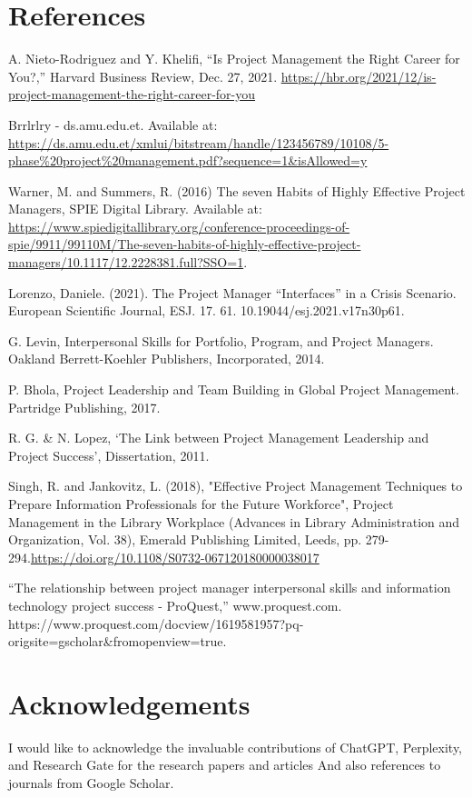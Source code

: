 \documentclass{article}
\begin{document}
\section*{References}
\vspace*{-35pt}
\renewcommand{\refname}{}
\begin{thebibliography}{99}
A. Nieto-Rodriguez and Y. Khelifi, “Is Project Management the Right Career for You?,” Harvard Business Review, Dec. 27, 2021. \url{https://hbr.org/2021/12/is-project-management-the-right-career-for-you}

Brrlrlry - ds.amu.edu.et. Available at: 
\url{https://ds.amu.edu.et/xmlui/bitstream/handle/123456789/10108/5-phase%20project%20management.pdf?sequence=1&isAllowed=y}

Warner, M. and Summers, R. (2016) The seven Habits of Highly Effective Project Managers, SPIE Digital Library. Available at: \url{https://www.spiedigitallibrary.org/conference-proceedings-of-spie/9911/99110M/The-seven-habits-of-highly-effective-project-managers/10.1117/12.2228381.full?SSO=1}. 

Lorenzo, Daniele. (2021). The Project Manager “Interfaces” in a Crisis Scenario. European Scientific Journal, ESJ. 17. 61. 10.19044/esj.2021.v17n30p61. 


G. Levin, Interpersonal Skills for Portfolio, Program, and Project Managers. Oakland Berrett-Koehler Publishers, Incorporated, 2014.


P. Bhola, Project Leadership and Team Building in Global Project Management. Partridge Publishing, 2017.


R. G. \& N. Lopez, ‘The Link between Project Management Leadership and Project Success’, Dissertation, 2011.


Singh, R. and Jankovitz, L. (2018), "Effective Project Management Techniques to Prepare Information Professionals for the Future Workforce", Project Management in the Library Workplace (Advances in Library Administration and Organization, Vol. 38), Emerald Publishing Limited, Leeds, pp. 279-294.\url{https://doi.org/10.1108/S0732-067120180000038017}


“The relationship between project manager interpersonal skills and information technology project success - ProQuest,” www.proquest.com. https://www.proquest.com/docview/1619581957?pq-origsite=gscholar&fromopenview=true.


\end{thebibliography}

\newpage

\section{Acknowledgements}
I would like to acknowledge the invaluable contributions of ChatGPT, Perplexity, and Research Gate for the research papers and articles And also references to journals from Google Scholar.
\end{document}
